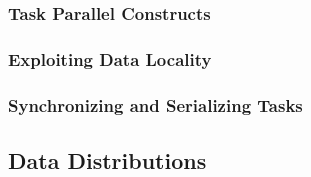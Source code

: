 \subsubsection{Task Parallel Constructs}
\label{Task_Parallel_Constructs}


\subsubsection{Exploiting Data Locality}
\label{Exploiting_Data_Locality}


\subsubsection{Synchronizing and Serializing Tasks}
\label{Synchronizing_and_Serializing_Tasks}


\subsection{Data Distributions}
\label{Data_Distributions}

